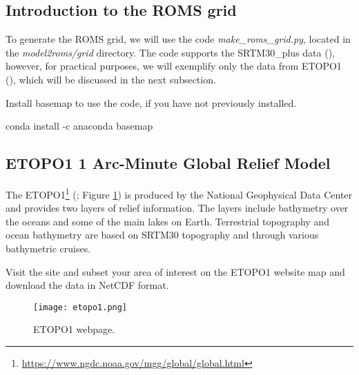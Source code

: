\subsection{Introduction to the ROMS grid}
\bigskip

To generate the ROMS grid, we will use the code \textit{make\_roms\_grid.py}, located in the \textit{model2roms/grid} 
directory. The code supports the SRTM30\_plus data (\cite{Becker2009}), however, for practical purposes, we will exemplify 
only the data from ETOPO1 (\cite{Amante2009}), which will be discussed in the next subsection.
\bigskip

Install basemap to use the code, if you have not previously installed.
\bigskip

\begin{bashcode}
conda install -c anaconda basemap
\end{bashcode}
\bigskip

\subsection{ETOPO1 1 Arc-Minute Global Relief Model}
\bigskip

The ETOPO1\textcolor{bleu_cite}{\textit{}\footnote{\textcolor{bleu_cite}{\href{https://www.ngdc.noaa.gov/mgg/global/global.html}{https://www.ngdc.noaa.gov/mgg/global/global.html}}}}
 (\cite{Amante2009}; Figure \textcolor{bleu_cite}{\ref{etopo1}}) 
is produced by the National Geophysical Data Center and provides two layers of relief information.
The layers include bathymetry over the oceans and some of the main lakes on Earth.
 Terrestrial topography and ocean bathymetry are based on SRTM30 topography and through various bathymetric cruises.
\bigskip

Visit the site
and subset your area of interest on the ETOPO1 website map and download the data in NetCDF format.

\bigskip  
   
\begin{figure}[H]
    \centering
    \texttt{[image: etopo1.png]}
    \caption{ETOPO1 webpage.}
    \label{etopo1}
\end{figure}
\bigskip


\bigskip

